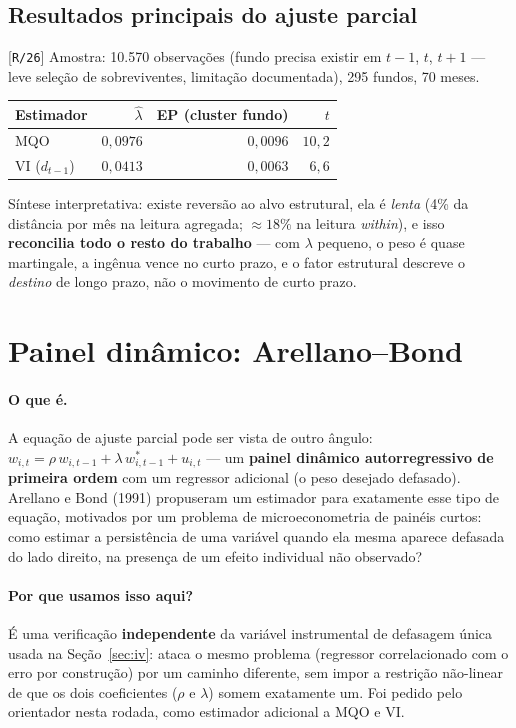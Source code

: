 \documentclass[11pt,a4paper]{article}
\newcommand{\porque}[0]{\paragraph{Por que usamos isso aqui?}}
\newcommand{\oquee}[0]{\paragraph{O que é.}}
\newcommand{\scriptref}[1]{{\footnotesize\color{cinza}[\texttt{#1}]}}
\begin{document}
\subsection{Resultados principais do ajuste parcial}

\scriptref{R/26} Amostra: 10.570 observações (fundo precisa existir em $t-1$, $t$, $t+1$ --- leve
seleção de sobreviventes, limitação documentada), 295 fundos, 70 meses.

\begin{center}\small
\begin{tabular}{@{}lrrr@{}}
\toprule
Estimador & $\widehat\lambda$ & EP (cluster fundo) & $t$ \\
\midrule
MQO & $0{,}0976$ & $0{,}0096$ & $10{,}2$ \\
VI ($d_{t-1}$) & $0{,}0413$ & $0{,}0063$ & $6{,}6$ \\
\bottomrule
\end{tabular}
\end{center}

Síntese interpretativa: existe reversão ao alvo estrutural, ela é \emph{lenta} (4\% da distância
por mês na leitura agregada; $\approx18\%$ na leitura \emph{within}), e isso \textbf{reconcilia
todo o resto do trabalho} --- com $\lambda$ pequeno, o peso é quase martingale, a ingênua vence no
curto prazo, e o fator estrutural descreve o \emph{destino} de longo prazo, não o movimento de
curto prazo.

\section{Painel dinâmico: Arellano--Bond}
\label{sec:ab}

\oquee A equação de ajuste parcial pode ser vista de outro ângulo: $w_{i,t} = \rho\,w_{i,t-1} +
\lambda\,w^*_{i,t-1} + u_{i,t}$ --- um \textbf{painel dinâmico autorregressivo de primeira ordem}
com um regressor adicional (o peso desejado defasado). Arellano e Bond (1991) propuseram um
estimador para exatamente esse tipo de equação, motivados por um problema de microeconometria de
painéis curtos: como estimar a persistência de uma variável quando ela mesma aparece defasada do
lado direito, na presença de um efeito individual não observado?

\porque É uma verificação \textbf{independente} da variável instrumental de defasagem única
usada na Seção~\ref{sec:iv}: ataca o mesmo problema (regressor correlacionado com o erro por
construção) por um caminho diferente, sem impor a restrição não-linear de que os dois
coeficientes ($\rho$ e $\lambda$) somem exatamente um. Foi pedido pelo orientador nesta rodada,
como estimador adicional a MQO e VI.
\end{document}
